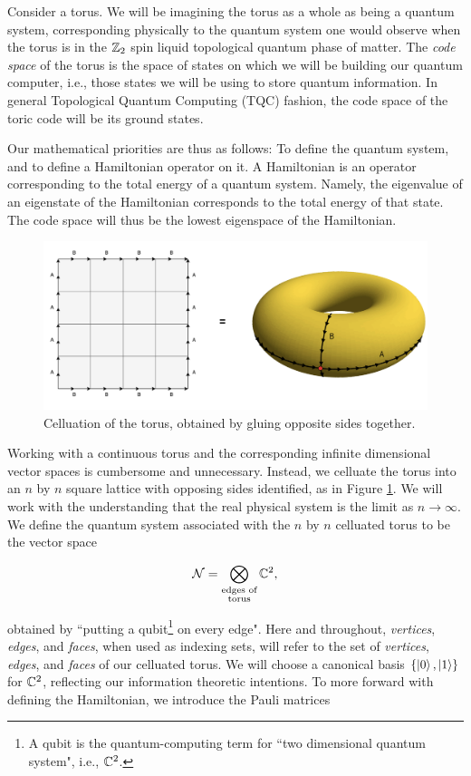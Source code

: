 \documentclass{article}
\theoremstyle{definition}
\numberwithin{figure}{section}
\begin{document}
Consider a torus. We will be imagining the torus as a whole as being a quantum system, corresponding physically to the quantum system one would observe when the torus is in the $\mathbb{Z}_2$ spin liquid topological quantum phase of matter. The \textit{code space} of the torus is the space of states on which we will be building our quantum computer, i.e., those states we will be using to store quantum information. In general Topological Quantum Computing (TQC) fashion, the code space of the toric code will be its ground states.

Our mathematical priorities are thus as follows: To define the quantum system, and to define a Hamiltonian operator on it. A Hamiltonian is an operator corresponding to the total energy of a quantum system. Namely, the eigenvalue of an eigenstate of the Hamiltonian corresponds to the total energy of that state. The code space will thus be the lowest eigenspace of the Hamiltonian.

\begin{figure}
\begin{center}
\includegraphics[scale=0.25]{torus}
\caption{Celluation of the torus, obtained by gluing opposite sides together.}
\label{fig:torus}
\end{center}
\end{figure}

Working with a continuous torus and the corresponding infinite dimensional vector spaces is cumbersome and unnecessary. Instead, we celluate the torus into an $n$ by $n$ square lattice with opposing sides identified, as in Figure \ref{fig:torus}. We will work with the understanding that the real physical system is the limit as $n\to\infty$. We define the quantum system associated with the $n$ by $n$ celluated torus to be the vector space

$$\mathcal{N}=\bigotimes_{\substack{\text{edges of}\\\text{torus}}}\mathbb{C}^2,$$

obtained by ``putting a qubit\footnote{A qubit is the quantum-computing term for ``two dimensional quantum system", i.e., $\mathbb{C}^2$.}
on every edge". Here and throughout, \textit{vertices}, \textit{edges}, and \textit{faces}, when used as indexing sets, will refer to the set of \textit{vertices}, \textit{edges}, and \textit{faces} of our celluated torus. We will choose a canonical basis $\left\{\left|0\right>,\left|1\right>\right\}$ for $\mathbb{C}^2$, reflecting our information theoretic intentions. To more forward with defining the Hamiltonian, we introduce the Pauli matrices
\end{document}
